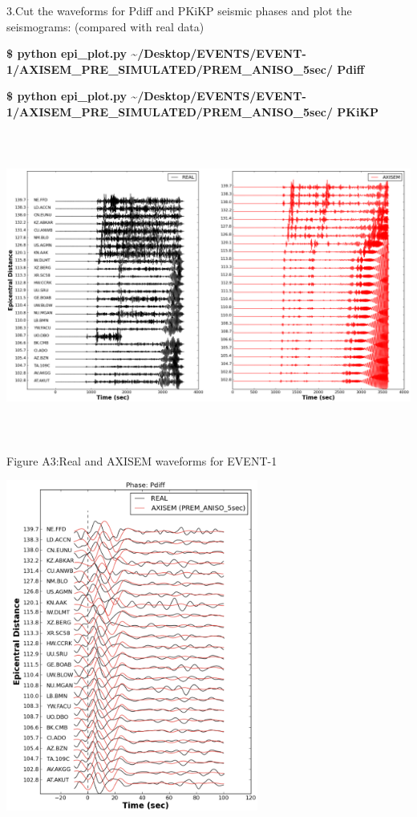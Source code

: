 \documentclass{article}
\begin{document}
3.Cut the waveforms for Pdiff and PKiKP seismic phases and plot the seismograms: 
(compared with real data)

\textbf{\$ python epi\_plot.py \textasciitilde{}/Desktop/EVENTS/EVENT-1/AXISEM\_PRE\_SIMULATED/PREM\_ANISO\_5sec/ 
Pdiff}

\textbf{\$ python epi\_plot.py \textasciitilde{}/Desktop/EVENTS/EVENT-1/AXISEM\_PRE\_SIMULATED/PREM\_ANISO\_5sec/ 
PKiKP}

\begin{center}
\includegraphics[width=497pt, height=287pt, keepaspectratio=true]{AXISEMTutorial-fig007.png}

{\small{}Figure A3:Real and AXISEM waveforms for EVENT-1}
\end{center}

\baselineskip=13pt
\leftskip=0pt
\includegraphics[width=235pt, height=309pt, keepaspectratio=true]{AXISEMTutorial-fig008.pdf}
\end{document}
